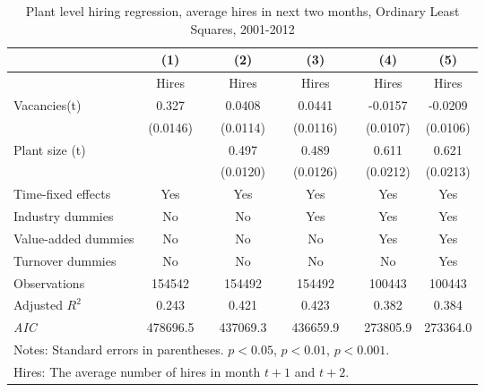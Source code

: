 \begin{table}[htbp]
\caption{\label{tab:robust_2m_avg} Plant level hiring regression, average hires in next two months, Ordinary Least Squares,  2001-2012}
\begin{tabularx} {\textwidth} { l cXcXcXcc}
\hline
       &   (1) &&     (2) &&    (3)       &&   (4)        &   (5)      \\
\hline
        &   \footnotesize{ Hires } &&     \footnotesize{ Hires} &&    \footnotesize{ Hires }      &&  \footnotesize{ Hires }       &    \footnotesize{ Hires}     \\
\hline
Vacancies(t) &      0.327\sym{***} &&      0.0408\sym{***} &&      0.0441\sym{***} &&     -0.0157         &     -0.0209\sym{**} \\        
                    &    (0.0146)         &&    (0.0114)         &&    (0.0116)         &&    (0.0107)         &    (0.0106)         \\
Plant size (t)      &                   &&     0.497\sym{***}  &&       0.489\sym{***} &&       0.611\sym{***} &       0.621\sym{***} \\
                    &                   && (0.0120)         &&    (0.0126)         &&    (0.0212)         &    (0.0213)             \\
\hline
\footnotesize{Time-fixed effects}  & Yes                 && Yes                     &&           Yes          &&    Yes        &    Yes      \\
\footnotesize{Industry dummies}   & No                  && No                      &&     Yes                 &&    Yes        &   Yes      \\
\footnotesize{Value-added dummies} & No                  && No                      &&     No                 &&    Yes        &    Yes      \\
\footnotesize{Turnover dummies }   & No                  && No                      &&     No                 &&    No        &    Yes      \\
\hline
Observations        &   154542         &&      154492         &&      154492         &&      100443         &     100443        \\
Adjusted \(R^{2}\)  &     0.243         &&       0.421         &&       0.423         &&       0.382         &       0.384       \\
\textit{AIC}        &  478696.5         &&    437069.3         &&    436659.9         &&    273805.9         &    273364.0             \\
\hline\hline
\multicolumn{9}{l}{\footnotesize Notes: Standard errors in parentheses. \sym{*} \(p<0.05\), \sym{**} \(p<0.01\), \sym{***} \(p<0.001\).   }\\
\multicolumn{9}{l}{\footnotesize  Hires: The average number of hires in month $t+1$ and $t+2$. }\\
\end{tabularx}
\end{table}




